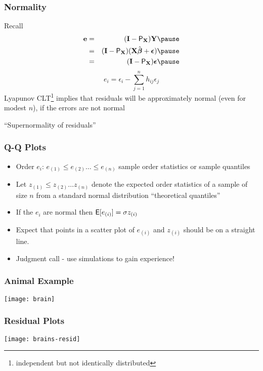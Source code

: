 \documentclass[]{beamer}
\begin{document}
\begin{frame}
    \frametitle{Normality}
    Recall
    \begin{eqnarray*}
 \e & = &(\I - \P_\X) \Y \pause \\      
 & = & (\I - \P_\X)(\X \bhat + \eps)  \pause\\
 & = &  (\I - \P_\X)\eps  \pause
    \end{eqnarray*}
$$e_i = \epsilon_i - \sum_{j=1}^n h_{ij} \epsilon_j$$  \pause
Lyapunov CLT\footnote{independent but not identically distributed} implies that  residuals will be approximately normal
(even for modest $n$), 
if the errors are not normal  \pause

\vfill

``Supernormality of residuals''
  \end{frame}
  \begin{frame}
    \frametitle{Q-Q Plots}
\begin{itemize}
\item Order $e_i$: $e_{(1)} \le e_{(2)} \ldots \le e_{(n)}$  sample
    order statistics or sample quantiles  \pause
\item Let $z_{(1)} \le z_{(2)} \ldots z_{(n)}$ denote the expected
  order statistics of a sample of size $n$ from a standard normal
  distribution ``theoretical quantiles''  \pause
\item If the $e_i$ are normal then $\textsf{E}[e_{(i)}] = \sigma z_{(i)}$   \pause
\item Expect that points in a scatter plot of $e_{(i)}$ and $z_{(i)}$
  should be on a straight line.  \pause
\item Judgment call - use simulations to gain experience!
\end{itemize}
    
  \end{frame}

  \begin{frame}
    \frametitle{Animal Example}

\centerline{\texttt{[image: brain]}}
  \end{frame}

  \begin{frame}
    \frametitle{Residual Plots}

\centerline{\texttt{[image: brains-resid]}}
  \end{frame}
\end{document}
